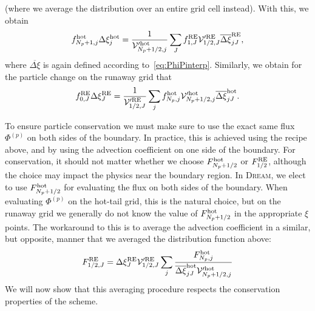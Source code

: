 \documentclass{notes}
\newcommand{\DREAM}{\textsc{Dream}}
\newcommand{\Vp}{\mathcal{V}'}
\begin{document}
    (where we average the distribution over an entire grid cell instead).
    With this, we obtain
    \begin{equation}
        f^{\rm hot}_{N_p+1,j}\Delta\xi_j^{\rm hot} =
            \frac{1}{\Vp^{\rm hot}_{N_p+1/2,j}} \sum_J
                f_{1,J}^{\rm RE} \Vp^{\rm RE}_{1/2,J} \overline{\Delta\xi}_{jJ}^{\rm RE},
    \end{equation}
    where $\overline{\Delta\xi}$ is again defined according
    to~\eqref{eq:PhiPinterp}. Similarly, we obtain for the particle change on
    the runaway grid that
    \begin{equation}\label{eq:crossFlux_fRE0}
        f^{\rm RE}_{0,J}\Delta\xi_J^{\rm RE} =
            \frac{1}{\Vp^{\rm RE}_{1/2,J}} \sum_j
                f_{N_p,j}^{\rm hot} \Vp^{\rm hot}_{N_p+1/2,j} \overline{\Delta\xi}_{jJ}^{\rm hot}.
    \end{equation}

    To ensure particle conservation we must make sure to use the exact same flux
    $\Phi^{(p)}$ on both sides of the boundary. In practice, this is achieved
    using the recipe above, and by using the advection coefficient on one side
    of the boundary. For conservation, it should not matter whether we choose
    $F_{N_p+1/2}^{\rm hot}$ or $F_{1/2}^{\rm RE}$, although the choice may
    impact the physics near the boundary region. In \DREAM, we elect to use
    $F_{N_p+1/2}^{\rm hot}$ for evaluating the flux on both sides of the
    boundary. When evaluating $\Phi^{(p)}$ on the hot-tail grid, this is the
    natural choice, but on the runaway grid we generally do not know the value
    of $F^{\rm hot}_{N_p+1/2}$ in the appropriate $\xi$ points. The workaround
    to this is to average the advection coefficient in a similar, but opposite,
    manner that we averaged the distribution function above:
    \begin{equation}\label{eq:crossFlux_FRE}
        F^{\rm RE}_{1/2,J} =
            \Delta\xi_J^{\rm RE}\Vp^{\rm RE}_{1/2,J}
            \sum_j \frac{F_{N_p,j}^{\rm hot}}
                {\overline{\Delta\xi}_{jJ}^{\rm hot}\Vp^{\rm hot}_{N_p+1/2,j}}
    \end{equation}
    We will now show that this averaging procedure respects the conservation
    properties of the scheme.
\end{document}

